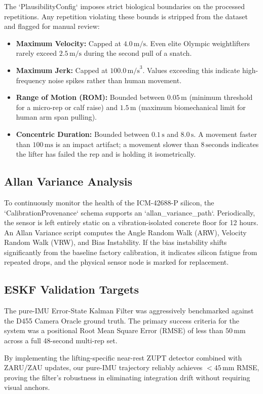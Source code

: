The `PlausibilityConfig` imposes strict biological boundaries on the processed repetitions. Any repetition violating these bounds is stripped from the dataset and flagged for manual review:
\begin{itemize}
    \item \textbf{Maximum Velocity:} Capped at $4.0\,\text{m/s}$. Even elite Olympic weightlifters rarely exceed $2.5\,\text{m/s}$ during the second pull of a snatch.
    \item \textbf{Maximum Jerk:} Capped at $100.0\,\text{m/s}^3$. Values exceeding this indicate high-frequency noise spikes rather than human movement.
    \item \textbf{Range of Motion (ROM):} Bounded between $0.05\,\text{m}$ (minimum threshold for a micro-rep or calf raise) and $1.5\,\text{m}$ (maximum biomechanical limit for human arm span pulling).
    \item \textbf{Concentric Duration:} Bounded between $0.1\,\text{s}$ and $8.0\,\text{s}$. A movement faster than $100\,\text{ms}$ is an impact artifact; a movement slower than $8\,\text{seconds}$ indicates the lifter has failed the rep and is holding it isometrically.
\end{itemize}

\subsection{Allan Variance Analysis}
To continuously monitor the health of the ICM-42688-P silicon, the `CalibrationProvenance` schema supports an `allan_variance_path`. Periodically, the sensor is left entirely static on a vibration-isolated concrete floor for 12 hours. An Allan Variance script computes the Angle Random Walk (ARW), Velocity Random Walk (VRW), and Bias Instability. If the bias instability shifts significantly from the baseline factory calibration, it indicates silicon fatigue from repeated drops, and the physical sensor node is marked for replacement.

\subsection{ESKF Validation Targets}
The pure-IMU Error-State Kalman Filter was aggressively benchmarked against the D455 Camera Oracle ground truth. The primary success criteria for the system was a positional Root Mean Square Error (RMSE) of less than $50\,\text{mm}$ across a full 48-second multi-rep set. 

By implementing the lifting-specific near-rest ZUPT detector combined with ZARU/ZAU updates, our pure-IMU trajectory reliably achieves $< 45\,\text{mm}$ RMSE, proving the filter's robustness in eliminating integration drift without requiring visual anchors.

